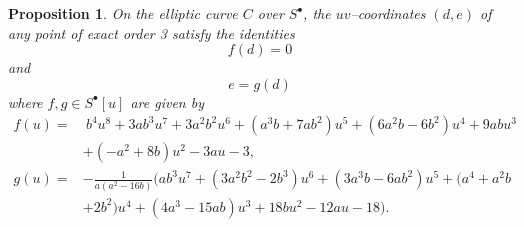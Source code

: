 \documentclass[microtype]{gtpart}     %
\newtheorem{prop}{Proposition}[section]
\theoremstyle{remark}
\theoremstyle{definition}
\newcommand{\s}{S^\bullet}
\begin{document}
\begin{prop}
\label{prop:tors}
 On the elliptic curve $C$ over $\s$, the $uv$--coordinates $(d,e)$ of any 
 point of exact order 3 satisfy the identities 
 \begin{equation}
 \label{f}
  f(d) = 0 
 \end{equation}
 and 
 \begin{equation}
 \label{g}
  e = g(d) 
 \end{equation}
 where $f, g \in \s [u]$ are given by 
 \begin{equation*}
 \begin{split}
  f(u) = & ~ b^4 u^8 + 3 a b^3 u^7 + 3 a^2 b^2 u^6 + (a^3 b + 7 a b^2) u^5 + (6 a^2 b - 6 b^2) u^4 + 9 a b u^3 \\
         & + (-a^2 + 8 b) u^2 - 3 a u - 3, \\
  g(u) = & -\frac{1}{a (a^2 - 16 b)} \big( a b^3 u^7 + (3 a^2 b^2 - 2 b^3) u^6 + (3 a^3 b - 6 a b^2) u^5 + (a^4 + a^2 b \\
         & + 2 b^2) u^4 + (4 a^3 - 15 a b) u^3 + 18 b u^2 - 12 a u - 18 \big).  
 \end{split}
 \end{equation*}
\end{prop}
\end{document}
